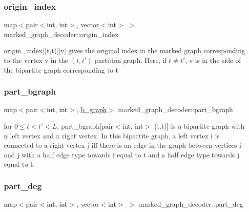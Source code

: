 \subsubsection{\texorpdfstring{origin\+\_\+index}{origin\_index}}
{\footnotesize\ttfamily map$<$pair$<$int, int$>$, vector$<$int$>$ $>$ marked\+\_\+graph\+\_\+decoder\+::origin\+\_\+index\hspace{0.3cm}{\ttfamily [private]}}



origin\+\_\+index\mbox{[}(t,t\textquotesingle{})\mbox{]}\mbox{[}v\mbox{]} gives the original index in the marked graph corresponding to the vertex v in the $(t,t')$ partition graph. Here, if $t \neq t'$, v is in the side of the bipartite graph corresponding to t 

\mbox{\label{classmarked__graph__decoder_a6be777b8c1e1b02ce79b5081056794ae}} 
\subsubsection{\texorpdfstring{part\+\_\+bgraph}{part\_bgraph}}
{\footnotesize\ttfamily map$<$pair$<$int, int$>$, \hyperlink{classb__graph}{b\+\_\+graph}$>$ marked\+\_\+graph\+\_\+decoder\+::part\+\_\+bgraph\hspace{0.3cm}{\ttfamily [private]}}



for $0 \leq t < t' < L$, part\+\_\+bgraph\mbox{[}pair$<$int, int$>$ (t,t\textquotesingle{})\mbox{]} is a bipartite graph with n left vertex and n right vertex. In this bipartite graph, a left vertex i is connected to a right vertex j iff there is an edge in the graph between vertices i and j with a half edge type towards i equal to t and a half edge type towards j equal to t\textquotesingle{}. 

\mbox{\label{classmarked__graph__decoder_a6882e96fcad9abb10e72f1398814824a}} 
\subsubsection{\texorpdfstring{part\+\_\+deg}{part\_deg}}
{\footnotesize\ttfamily map$<$pair$<$int, int$>$, vector$<$int$>$ $>$ marked\+\_\+graph\+\_\+decoder\+::part\+\_\+deg\hspace{0.3cm}{\ttfamily [private]}}



